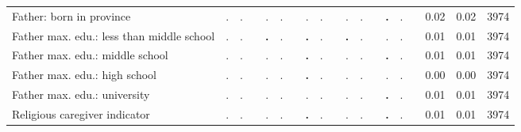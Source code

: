 \begin{tabular}{l c c c c c c c c c c c c c c c c c c}
Father: born in province &         . &         . & &         . &         . & &         . &         . & &         . &         . & & \textbf{        .} &         . & &      0.02 &      0.02 &      3974 \\
Father max. edu.: less than middle school &         . &         . & & \textbf{        .} &         . & & \textbf{        .} &         . & & \textbf{        .} &         . & &         . &         . & &      0.01 &      0.01 &      3974 \\
Father max. edu.: middle school &         . &         . & &         . &         . & & \textbf{        .} &         . & &         . &         . & & \textbf{        .} &         . & &      0.01 &      0.01 &      3974 \\
Father max. edu.: high school &         . &         . & &         . &         . & & \textbf{        .} &         . & &         . &         . & &         . &         . & &      0.00 &      0.00 &      3974 \\
Father max. edu.: university &         . &         . & &         . &         . & &         . &         . & &         . &         . & & \textbf{        .} &         . & &      0.01 &      0.01 &      3974 \\
Religious caregiver indicator &         . &         . & &         . &         . & & \textbf{        .} &         . & &         . &         . & & \textbf{        .} &         . & &      0.01 &      0.01 &      3974 \\
\bottomrule
\end{tabular}
